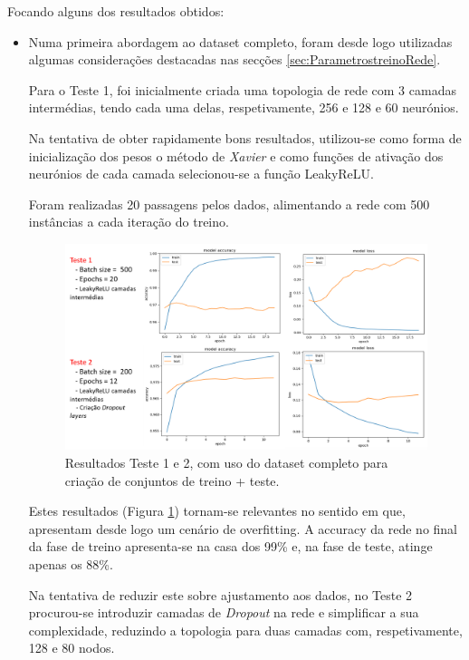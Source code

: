 Focando alguns dos resultados obtidos:
\begin{itemize}
    \item Numa primeira abordagem ao dataset completo, foram desde logo utilizadas algumas considerações destacadas nas secções \ref{sec:ParametrostreinoRede}.
    
    Para o Teste 1, foi inicialmente criada uma topologia de rede com 3 camadas intermédias, tendo cada uma delas, respetivamente, 256 e 128 e 60 neurónios. 
    
    Na tentativa de obter rapidamente bons resultados, utilizou-se como forma de inicialização dos pesos o método de \textit{Xavier} e como funções de ativação dos neurónios de cada camada selecionou-se a função LeakyReLU. 
    
    Foram realizadas 20 passagens pelos dados, alimentando a rede com 500 instâncias a cada iteração do treino. 
    
    \begin{figure}[H]
        \hspace{-0.4in}
        \includegraphics[scale=0.65]{Imagens/t37.png}
        \caption{Resultados Teste 1 e 2, com uso do dataset completo para criação de conjuntos de treino + teste.}
        \label{fig:teste1}
    \end{figure}
    
    Estes resultados (Figura \ref{fig:teste1}) tornam-se relevantes no sentido em que, apresentam desde logo um cenário de overfitting. A accuracy da rede no final da fase de treino apresenta-se na casa dos 99\% e, na fase de teste, atinge apenas os 88\%. 
    
    Na tentativa de reduzir este sobre ajustamento aos dados, no Teste 2 procurou-se introduzir camadas de \textit{Dropout} na rede e simplificar a sua complexidade, reduzindo a topologia para duas camadas com, respetivamente, 128 e 80 nodos. 
    

\end{itemize}
